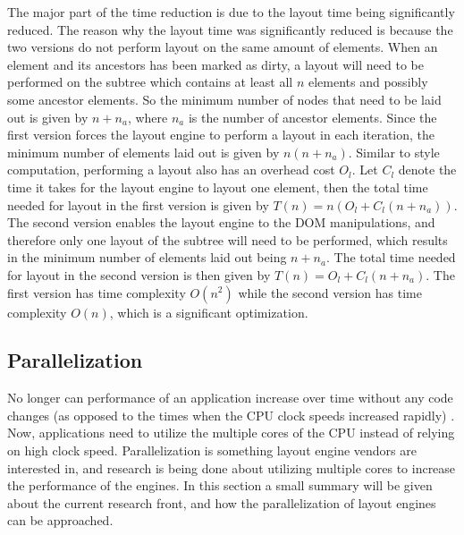 \documentclass[a4paper,11pt]{kth-mag}
\begin{document}
        The major part of the time reduction is due to the layout time being significantly reduced.
        The reason why the layout time was significantly reduced is because the two versions do not perform layout on the same amount of \glspl{element}.
        When an element and its ancestors has been marked as dirty, a layout will need to be performed on the subtree which contains at least all $n$ \glspl{element} and possibly some ancestor \glspl{element}.
        So the minimum number of nodes that need to be laid out is given by $n + n_{a}$, where $n_a$ is the number of ancestor \glspl{element}.
        Since the first version forces the \gls{layout engine} to perform a layout in each iteration, the minimum number of \glspl{element} laid out is given by $n(n + n_a)$.
        Similar to style computation, performing a layout also has an overhead cost $O_{l}$.
        Let $C_{l}$ denote the time it takes for the \gls{layout engine} to layout one \gls{element}, then the total time needed for layout in the first version is given by $T(n) = n(O_{l} + C_{l}(n + n_a))$.
        The second version enables the \gls{layout engine} to  the \gls{DOM} manipulations, and therefore only one layout of the subtree will need to be performed, which results in the minimum number of \glspl{element} laid out being $n + n_a$.
        The total time needed for layout in the second version is then given by $T(n) = O_{l} + C_{l}(n + n_a)$.
        The first version has time complexity $O(n^2)$ while the second version has time complexity $O(n)$, which is a significant optimization.


      \subsection{Parallelization}\label{sec:parallel}
        No longer can performance of an application increase over time without any code changes (as opposed to the times when the \gls{CPU} clock speeds increased rapidly) \cite{parallelizing_the_web_browser}.
        Now, applications need to utilize the multiple cores of the \gls{CPU} instead of relying on high clock speed.
        Parallelization is something \gls{layout engine} vendors are interested in, and research is being done about utilizing multiple cores to increase the performance of the engines.
        In this section a small summary will be given about the current research front, and how the parallelization of \glspl{layout engine} can be approached.
\end{document}
